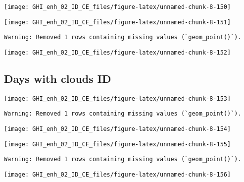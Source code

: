 \documentclass[
  10pt,
  a4paper,oneside]{article}
\begin{document}
\begin{center}\texttt{[image: GHI\_enh\_02\_ID\_CE\_files/figure-latex/unnamed-chunk-8-150]} \end{center}

\begin{center}\texttt{[image: GHI\_enh\_02\_ID\_CE\_files/figure-latex/unnamed-chunk-8-151]} \end{center}

\begin{verbatim}
Warning: Removed 1 rows containing missing values (`geom_point()`).
\end{verbatim}

\begin{center}\texttt{[image: GHI\_enh\_02\_ID\_CE\_files/figure-latex/unnamed-chunk-8-152]} \end{center}

\FloatBarrier

\hypertarget{days-with-clouds-id}{%
\subsection{Days with clouds ID}\label{days-with-clouds-id}}

\begin{center}\texttt{[image: GHI\_enh\_02\_ID\_CE\_files/figure-latex/unnamed-chunk-8-153]} \end{center}

\begin{verbatim}
Warning: Removed 1 rows containing missing values (`geom_point()`).
\end{verbatim}

\begin{center}\texttt{[image: GHI\_enh\_02\_ID\_CE\_files/figure-latex/unnamed-chunk-8-154]} \end{center}

\begin{center}\texttt{[image: GHI\_enh\_02\_ID\_CE\_files/figure-latex/unnamed-chunk-8-155]} \end{center}

\begin{verbatim}
Warning: Removed 1 rows containing missing values (`geom_point()`).
\end{verbatim}

\begin{center}\texttt{[image: GHI\_enh\_02\_ID\_CE\_files/figure-latex/unnamed-chunk-8-156]} \end{center}
\end{document}
